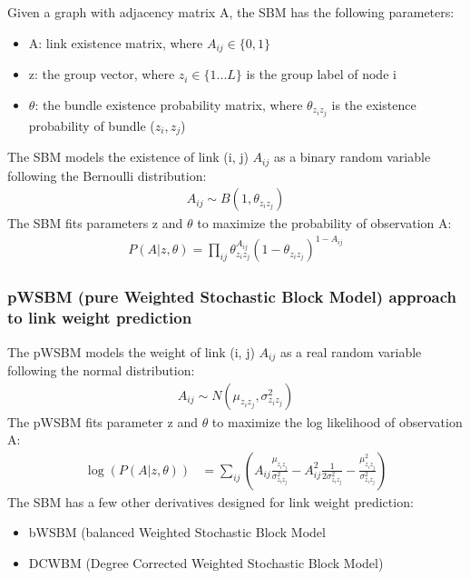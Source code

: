 \documentclass{article}
\begin{document}
\begin{landscape}
\begin{itemize}
\end{itemize}
Given a graph with adjacency matrix A, the SBM has the following parameters:
\begin{itemize}
	\item A: link existence matrix, where $ A_{ij} \in \{0, 1\} $
	\item z: the group vector,
	where $ z_i \in \{ 1 ... L \} $ is the group label of node i
	\item $ \theta $: the bundle existence probability matrix,
	where $ \theta_{z_i z_j} $ is the existence probability of bundle ($z_i, z_j$)
\end{itemize}
The SBM models the existence of link (i, j) $ A_{ij} $ as a binary random variable following the Bernoulli distribution:
\begin{align*}
A_{ij} \sim B(1, \theta_{z_i z_j})
\end{align*}
The SBM fits parameters z and $ \theta $
to maximize the probability of observation A:
\begin{align*}
P(A|z, \theta) 
= \prod_{ij} \theta_{z_i z_j}^{A_{ij}}(1-\theta_{z_i z_j})^{1-A_{ij}}
\end{align*}

\pagebreak
\subsubsection{pWSBM (pure Weighted Stochastic Block Model) approach to link weight prediction}
The pWSBM models the weight of link (i, j) $ A_{ij} $ as a real random variable following the normal distribution:
\begin{align*}
A_{ij} \sim N(\mu_{z_i z_j}, \sigma_{z_i z_j}^2)
\end{align*}
The pWSBM fits parameter z and $ \theta $
to maximize the log likelihood of observation A:
\begin{align*}
\log(P(A|z, \theta))
&= \sum_{ij} (
A_{ij} \frac{\mu_{z_i z_j}}{\sigma_{z_i z_j}^2}
- A_{ij}^2 \frac{1}{2\sigma_{z_i z_j}^2}
- \frac{\mu_{z_i z_j}^2}{\sigma_{z_i z_j}^2}
)
\end{align*}
The SBM has a few other derivatives designed for link weight prediction:
\begin{itemize}
	\item bWSBM (balanced Weighted Stochastic Block Model
	\item DCWBM (Degree Corrected Weighted Stochastic Block Model)
\end{itemize}


\end{landscape}
\end{document}
